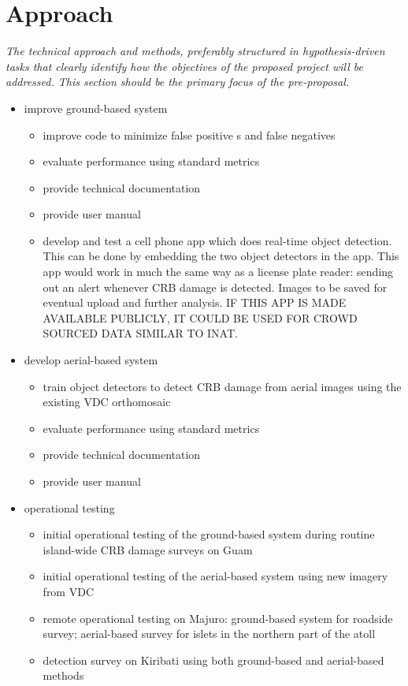 \documentclass[11pt,english,letterpaper]{scrartcl}
\begin{document}
\section{Approach}

\textit{The technical approach and methods, preferably structured in hypothesis-driven tasks that clearly identify how the objectives of the proposed project will be addressed. This section should be the primary focus of the pre-proposal.}

\begin{itemize}
	
	\item improve ground-based system
	\begin{itemize}
		\item improve code to minimize false positive s and false negatives
		\item evaluate performance using standard metrics
		\item provide technical documentation
		\item provide user manual
		\item develop and test a cell phone app which does real-time object detection. This can be done by embedding the two object detectors in the app. This app would work in much the same way as a license plate reader: sending out an alert whenever CRB damage is detected. Images to be saved for eventual upload and further analysis. IF THIS APP IS MADE AVAILABLE PUBLICLY, IT COULD BE USED FOR CROWD SOURCED DATA SIMILAR TO INAT.
	\end{itemize}
	
	\item develop aerial-based system
	\begin{itemize}
		\item train object detectors to detect CRB damage from aerial images using the existing VDC orthomosaic
		\item evaluate performance using standard metrics
		\item provide technical documentation
		\item provide user manual
	\end{itemize}
	
	\item operational testing
	\begin{itemize}
		\item initial operational testing of the ground-based system during routine island-wide CRB damage surveys on Guam
		\item initial operational testing of the aerial-based system using new imagery from VDC
		\item remote operational testing on Majuro: ground-based system for roadside survey; aerial-based survey for islets in the northern part of the atoll
		\item detection survey on Kiribati using both ground-based and aerial-based methods		
	\end{itemize}
	
\end{itemize}
\end{document}
